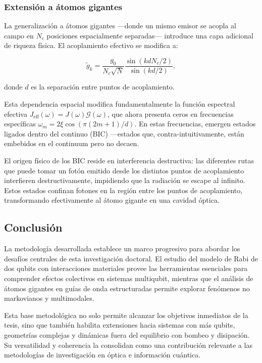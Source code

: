 \documentclass[onecolumn,notitlepage,letterpaper,aps,pra,12pt]{article}
\numberwithin{equation}{section}
\begin{document}
\subsubsection{Extensión a átomos gigantes}

La generalización a átomos gigantes —donde un mismo emisor se acopla al campo en $N_c$ posiciones espacialmente separadas— introduce una capa adicional de riqueza física. El acoplamiento efectivo se modifica a:

\[\tilde{g}_k = \frac{g_0}{N_c\sqrt{N}} \frac{\sin(kdN_c/2)}{\sin(kd/2)},\]

donde $d$ es la separación entre puntos de acoplamiento.

Esta dependencia espacial modifica fundamentalmente la función espectral efectiva $J_{\text{eff}}(\omega) = J(\omega) \mathcal{G}(\omega)$, que ahora presenta ceros en frecuencias específicas $\omega_m = 2\xi\cos(\pi(2m+1)/d)$. En estas frecuencias, emergen estados ligados dentro del continuo (BIC) —estados que, contra-intuitivamente, están embebidos en el continuum pero no decaen.

El origen físico de los BIC reside en interferencia destructiva: las diferentes rutas que puede tomar un fotón emitido desde los distintos puntos de acoplamiento interfieren destructivamente, impidiendo que la radiación se escape al infinito. Estos estados confinan fotones en la región entre los puntos de acoplamiento, transformando efectivamente al átomo gigante en una cavidad óptica.



\subsection{Conclusión }

La metodología desarrollada establece un marco  progresivo para abordar los desafíos centrales de esta investigación doctoral. El estudio del modelo de Rabi de dos qubits con interacciones materiales provee las herramientas esenciales para comprender efectos colectivos en sistemas multiqubit, mientras que el análisis de átomos gigantes en guías de onda estructuradas permite explorar fenómenos no markovianos y multimodales.

Esta base metodológica no solo permite alcanzar los objetivos inmediatos de la tesis, sino que también habilita extensiones hacia sistemas con más qubits, geometrías complejas y dinámicas fuera del equilibrio con bombeo y disipación. Su versatilidad y coherencia la consolidan como una contribución relevante a las metodologías de investigación en óptica e información cuántica.
\end{document}

